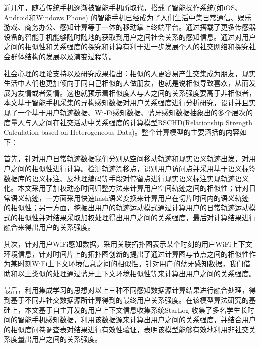 \begin{cabstract}
近几年，随着传统手机逐渐被智能手机所取代，搭载了智能操作系统(如iOS、Android和Windows Phone) 的智能手机已经成为了人们生活中集日常通信、娱乐游戏、商务办公、感知计算等于一体的移动掌上终端平台。通过搭载了更多传感器设备的智能手机能够随时随地的获取到用户之间社会关系的感知信息。通过对用户之间的相似性和关系强度的探究和计算有利于进一步发展个人的社交网络和探究社会群体结构的发展以及演变过程等。
\par 社会心理的理论支持以及研究成果指出：相似的人更容易产生交集成为朋友，现实生活中人们也更加倾向于同自己相似的人做朋友，也就是说相似导致喜欢，从而发展为友情或者爱情。这也就预示着相似度人与人之间的关系强度要高于非相似者，本文基于智能手机采集的异构感知数据对用户关系强度进行分析研究，设计并且实现了一个基于用户轨迹数据、Wi-Fi感知数据、蓝牙感知数据抽象出的多个层次的度量人与人之间在社交活动中关系强度的计算模型RSCHD(Relationship Strength Calculation based on  Heterogeneous Data)。整个计算模型的主要涵括的内容如下：
\par 首先，针对用户日常轨迹数据我们分别从空间移动轨迹和现实语义轨迹出发，对用户之间的相似性进行计算。检测轨迹漂移点，识别用户访问点并采用基于语义标签数据库的语义标注、反地理编码等手段对停留点进行现实语义标注实现轨迹语义化。本文采用了加权动态时间归整方法来计算用户空间轨迹之间的相似性；针对日常语义轨迹，一方面采用快速hash语义变换来计算用户在切片时间内的语义轨迹的相似性；另一方面，挖掘出用户的轨迹运动模式通过计算用户的日常轨迹运动模式的相似性并对结果采取加权处理得出用户之间的关系强度，最后对计算结果进行融合来得出用户的关系强度。

\par 其次，针对用户WiFi感知数据，采用关联拓扑图表示某个时刻的用户WiFi上下文环境信息，针对时间片上的拓扑图创新的提出了通过计算图与节点之间的相似性作为某时刻WiFi上下文环境信息之间的相似性。针对用户的蓝牙感知数据，我们借助和以上类似的处理通过蓝牙上下文环境相似性等来计算出用户之间的关系强度。

\par 最后，利用集成学习的思想对以上三种不同感知数据源计算结果进行融合处理，得到基于不同非社交数据源所计算得到的最终用户关系强度。在该模型算法研究的基础上，本文基于自主开发的用户上下文信息收集系统StarLog 收集了多名学生长时间的智能手机感知数据，利用该数据源来计算出用户之间的关系强度，并结合用户的相似度问卷调查表对结果进行有效性验证，表明该模型能够有效地利用非社交关系度量出用户之间的关系强度。
\end{cabstract}
